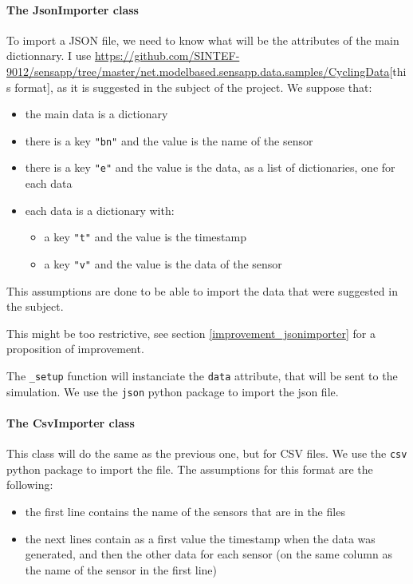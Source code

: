 \paragraph{The JsonImporter class}

To import a JSON file, we need to know what will be the attributes of the main dictionnary. I use \url{https://github.com/SINTEF-9012/sensapp/tree/master/net.modelbased.sensapp.data.samples/CyclingData}[this format], as it is suggested in the subject of the project. We suppose that:
\begin{itemize}
\item the main data is a dictionary
\item there is a key \verb!"bn"! and the value is the name of the sensor
\item there is a key \verb!"e"! and the value is the data, as a list of dictionaries, one for each data
\item each data is a dictionary with:
      \begin{itemize}
      \item a key \verb!"t"! and the value is the timestamp
      \item a key \verb!"v"! and the value is the data of the sensor
      \end{itemize}
\end{itemize}

This assumptions are done to be able to import the data that were suggested in the subject.

This might be too restrictive, see section \ref{improvement_jsonimporter} for a proposition of improvement.

The \verb!_setup! function will instanciate the \verb!data! attribute, that will be sent to the simulation. We use the \verb!json! python package to import the json file.

\paragraph{The CsvImporter class}

This class will do the same as the previous one, but for CSV files. We use the \verb!csv! python package to import the file. The assumptions for this format are the following:
\begin{itemize}
\item the first line contains the name of the sensors that are in the files
\item the next lines contain as a first value the timestamp when the data was generated, and then the other data for each sensor (on the same column as the name of the sensor in the first line)
\end{itemize}

